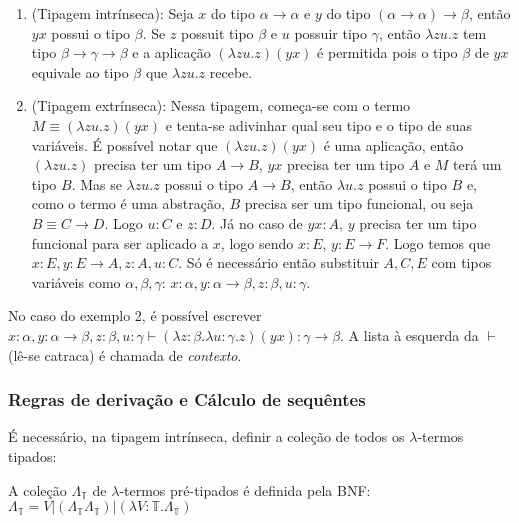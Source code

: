 \documentclass[../main.tex]{subfiles}
\begin{document}
\begin{enumerate}
    \item (Tipagem intrínseca): Seja $x$ do tipo $\alpha \to \alpha$ e $y$ do tipo $(\alpha \to \alpha) \to \beta$, então $yx$ possui o tipo $\beta$. Se $z$ possuit tipo $\beta$ e $u$ possuir tipo $\gamma$, então $\lambda zu . z$ tem tipo $\beta \to \gamma \to \beta$ e a aplicação $(\lambda zu . z)(yx)$ é permitida pois o tipo $\beta$ de $yx$ equivale ao tipo $\beta$ que $\lambda zu . z$ recebe.
    \item (Tipagem extrínseca): Nessa tipagem, começa-se com o termo $M \equiv (\lambda zu . z)(yx)$ e tenta-se adivinhar qual seu tipo e o tipo de suas variáveis. É possível notar que $(\lambda zu . z)(yx)$ é uma aplicação, então $(\lambda zu . z)$ precisa ter um tipo $A \to B$, $yx$ precisa ter um tipo $A$ e $M$ terá um tipo $B$. Mas se $\lambda zu . z$ possui o tipo $A \to B$, então $\lambda u . z$ possui o tipo $B$ e, como o termo é uma abstração, $B$ precisa ser um tipo funcional, ou seja $B \equiv C \to D$. Logo $u : C$ e $z : D$. Já no caso de $yx : A$, $y$ precisa ter um tipo funcional para ser aplicado a $x$, logo sendo $x : E$, $y : E \to F$. Logo temos que $x : E, y : E \to A, z : A, u : C$. Só é necessário então substituir $A, C, E$ com tipos variáveis como $\alpha, \beta, \gamma$: $x : \alpha, y : \alpha \to \beta, z : \beta, u : \gamma$.
\end{enumerate}

No caso do exemplo 2, é possível escrever $x : \alpha, y : \alpha \to \beta, z : \beta, u : \gamma \vdash (\lambda z : \beta . \lambda u : \gamma . z)(yx) : \gamma \to \beta$. A lista à esquerda da $\vdash$ (lê-se catraca) é chamada de \emph{contexto}.

\subsubsection{Regras de derivação e Cálculo de sequêntes}

É necessário, na tipagem intrínseca, definir a coleção de todos os $\lambda$-termos tipados:

\begin{definition}
    A coleção $\Lambda_{\mathbb{T}}$ de $\lambda$-termos pré-tipados é definida pela BNF: \\
    $\Lambda_{\mathbb{T}} = V | (\Lambda_{\mathbb{T}} \Lambda_{\mathbb{T}}) | (\lambda V :  \mathbb{T} . \Lambda_{\mathbb{T}})$
\end{definition}
\end{document}
